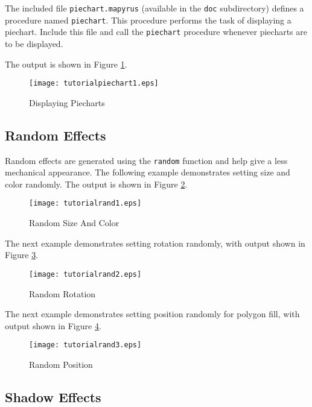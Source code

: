 The included file \texttt{piechart.mapyrus} (available in the \texttt{doc}
subdirectory) defines a procedure named \texttt{piechart}.  This procedure
performs the task of displaying a piechart.  Include this file and call the
\texttt{piechart} procedure whenever piecharts are to be displayed.

The output is shown in Figure \ref{tutorialpiechart1}.



\begin{figure}[htb]
\texttt{[image: tutorialpiechart1.eps]}
\caption{Displaying Piecharts}
\label{tutorialpiechart1}
\end{figure}

\subsection{Random Effects}

Random effects are generated using the \texttt{random}
function and help give a less mechanical appearance.
The following example demonstrates setting size and color randomly.
The output is shown in Figure \ref{tutorialrand1}.



\begin{figure}[htb]
\texttt{[image: tutorialrand1.eps]}
\caption{Random Size And Color}
\label{tutorialrand1}
\end{figure}

The next example demonstrates setting rotation randomly, with output shown in
Figure \ref{tutorialrand2}.



\begin{figure}[htb]
\texttt{[image: tutorialrand2.eps]}
\caption{Random Rotation}
\label{tutorialrand2}
\end{figure}

The next example demonstrates setting position randomly for polygon fill, with
output shown in Figure \ref{tutorialrand3}.



\begin{figure}[htb]
\texttt{[image: tutorialrand3.eps]}
\caption{Random Position}
\label{tutorialrand3}
\end{figure}

\subsection{Shadow Effects}

